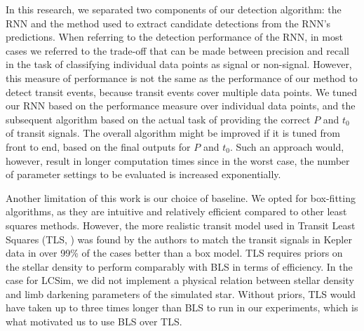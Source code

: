 In this research, we separated two components of our detection algorithm: the RNN and the method used to extract candidate detections from the RNN's predictions. When referring to the detection performance of the RNN, in most cases we referred to the trade-off that can be made between precision and recall in the task of classifying individual data points as signal or non-signal. However, this measure of performance is not the same as the performance of our method to detect transit events, because transit events cover multiple data points. We tuned our RNN based on the performance measure over individual data points, and the subsequent algorithm based on the actual task of providing the correct $P$ and $t_0$ of transit signals. The overall algorithm might be improved if it is tuned from front to end, based on the final outputs for $P$ and $t_0$. Such an approach would, however, result in longer computation times since in the worst case, the number of parameter settings to be evaluated is increased exponentially.

Another limitation of this work is our choice of baseline. We opted for box-fitting algorithms, as they are intuitive and relatively efficient compared to other least squares methods. However, the more realistic transit model used in Transit Least Squares (TLS, \cite{hippke2019optimized}) was found by the authors to match the transit signals in Kepler data in over 99\% of the cases better than a box model. TLS requires priors on the stellar density to perform comparably with BLS in terms of efficiency. In the case for LCSim, we did not implement a physical relation between stellar density and limb darkening parameters of the simulated star. Without priors, TLS would have taken up to three times longer than BLS to run in our experiments, which is what motivated us to use BLS over TLS. 

